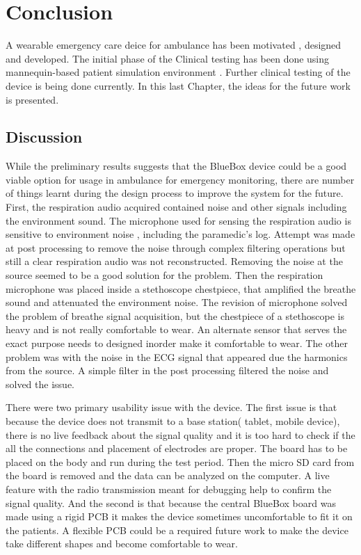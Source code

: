 \chapter{Conclusion}
A wearable emergency care deice for ambulance has been motivated , designed and developed. The initial phase of the Clinical testing has been done using mannequin-based patient simulation environment . Further clinical testing of the device is being done currently. In this last Chapter, the ideas for the future work is presented.  

\section{Discussion}
While the preliminary results suggests that the BlueBox device could be a good viable option for usage in ambulance for emergency monitoring, there are number of things learnt during the design process to improve the system for the future. First, the respiration audio acquired contained noise and other signals including the environment sound. The microphone used for sensing the respiration audio is sensitive to environment noise , including the paramedic's log. Attempt was made at post processing to remove the noise through complex filtering operations but still a clear respiration audio was not reconstructed. Removing the noise at the source seemed to be a good solution for the problem. Then the respiration microphone was placed inside a stethoscope chestpiece, that amplified the breathe sound and attenuated the environment noise. The revision of microphone solved the problem of breathe signal acquisition, but the chestpiece of a stethoscope is heavy and is not really comfortable to wear. An alternate sensor that serves the exact purpose needs to designed inorder make it comfortable to wear. The other problem was with the noise in the ECG signal that appeared due the harmonics from the source. A simple filter in the post processing filtered the noise and solved the issue.  


There were two primary usability issue with the device. The first issue is that because the device does not transmit to a base station( tablet, mobile device), there is no live feedback about the signal quality and it is too hard to check if the all the connections and placement of electrodes are proper. The board has to be placed on the body and run during the test period. Then the micro SD card from the board is removed and the data can be analyzed on the computer. A live feature with the radio transmission meant for debugging help to confirm the signal quality. 
And the second is that because the central BlueBox board was made using a rigid PCB it makes the device sometimes uncomfortable to fit it on the patients. A flexible PCB could be a required future work to make the device take different shapes and become comfortable to wear. 

